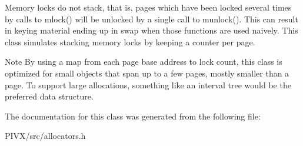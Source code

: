 Memory locks do not stack, that is, pages which have been locked several times by calls to mlock() will be unlocked by a single call to munlock(). This can result in keying material ending up in swap when those functions are used naively. This class simulates stacking memory locks by keeping a counter per page.

\begin{DoxyNote}{Note}
By using a map from each page base address to lock count, this class is optimized for small objects that span up to a few pages, mostly smaller than a page. To support large allocations, something like an interval tree would be the preferred data structure. 
\end{DoxyNote}


The documentation for this class was generated from the following file\+:\begin{DoxyCompactItemize}
\item 
P\+I\+V\+X/src/allocators.\+h\end{DoxyCompactItemize}
